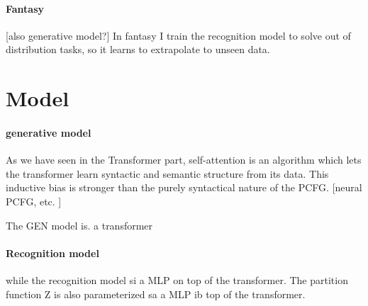 \paragraph{Fantasy}
[also generative model?]
In fantasy I train the recognition model to solve out of distribution tasks, so it learns to extrapolate to unseen data.













































\section{Model}


\paragraph{generative model}
As we have seen in the Transformer part, self-attention is an algorithm which lets the transformer learn syntactic and semantic structure from its data. This inductive bias is stronger than the purely syntactical nature of the PCFG.
[neural PCFG, etc. ]

The GEN model is. a transformer


\paragraph{Recognition model}
while the recognition model si a MLP on top of the transformer. The partition function Z is also parameterized sa a MLP ib top of the transformer. 


